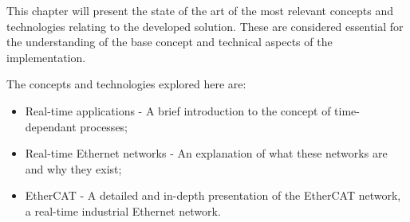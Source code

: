 
This chapter will present the state of the art of the most relevant concepts and technologies relating to the developed solution.
These are considered essential for the understanding of the base concept and technical aspects of the implementation.

The concepts and technologies explored here are:

\begin{itemize}
	\item Real-time applications - A brief introduction to the concept of time-dependant processes;

	\item Real-time Ethernet networks - An explanation of what these networks are and why they exist;

	\item EtherCAT - A detailed and in-depth presentation of the EtherCAT network, a real-time industrial Ethernet network.
\end{itemize}
